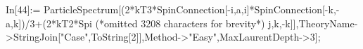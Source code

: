 In[44]:= ParticleSpectrum[(2*kT3*SpinConnection[-i,a,i]*SpinConnection[-k,-a,k])/3+(2*kT2*Spi (*omitted 3208 characters for brevity*) j,k,-k]],TheoryName->StringJoin["Case",ToString[2]],Method->"Easy",MaxLaurentDepth->3];